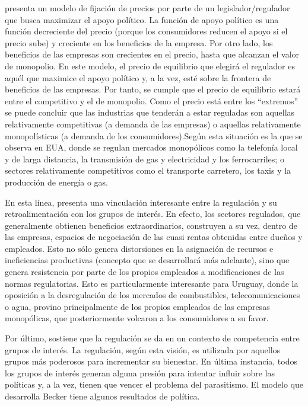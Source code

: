 \documentclass[
  12pt,
  spanish,
]{book}
\begin{document}
\citet{Peltzman1976} presenta un modelo de fijación de precios por parte
de un legislador/regulador que busca maximizar el apoyo político. La
función de apoyo político es una función decreciente del precio (porque
los consumidores reducen el apoyo si el precio sube) y creciente en los
beneficios de la empresa. Por otro lado, los beneficios de las empresas
son crecientes en el precio, hasta que alcanzan el valor de monopolio.
En este modelo, el precio de equilibrio que elegirá el regulador es
aquél que maximice el apoyo político y, a la vez, esté sobre la frontera
de beneficios de las empresas. Por tanto, se cumple que el precio de
equilibrio estará entre el competitivo y el de monopolio. Como el precio
está entre los ``extremos'' se puede concluir que las industrias que
tenderán a estar reguladas son aquellas relativamente competitivas (a
demanda de las empresas) o aquellas relativamente monopolísticas (a
demanda de los consumidores).Según \citet{Viscusi2005} esta situación es
la que se observa en EUA, donde se regulan mercados monopólicos como la
telefonía local y de larga distancia, la transmisión de gas y
electricidad y los ferrocarriles; o sectores relativamente competitivos
como el transporte carretero, los taxis y la producción de energía o
gas.

En esta línea, \citet{Noll1989} presenta una vinculación interesante
entre la regulación y su retroalimentación con los grupos de interés. En
efecto, los sectores regulados, que generalmente obtienen beneficios
extraordinarios, construyen a su vez, dentro de las empresas, espacios
de negociación de las cuasi rentas obtenidas entre dueños y empleados.
Esto no sólo genera distorsiones en la asignación de recursos e
ineficiencias productivas (concepto que se desarrollará más adelante),
sino que genera resistencia por parte de los propios empleados a
modificaciones de las normas regulatorias. Esto es particularmente
interesante para Uruguay, donde la oposición a la desregulación de los
mercados de combustibles, telecomunicaciones o agua, provino
principalmente de los propios empleados de las empresas monopólicas, que
posteriormente volcaron a los consumidores a su favor.

Por último, \citet{Becker1983} sostiene que la regulación se da en un
contexto de competencia entre grupos de interés. La regulación, según
esta visión, es utilizada por aquellos grupos más poderosos para
incrementar su bienestar. En última instancia, todos los grupos de
interés generan alguna presión para intentar influir sobre las políticas
y, a la vez, tienen que vencer el problema del parasitismo. El modelo
que desarrolla Becker tiene algunos resultados de política.
\end{document}
